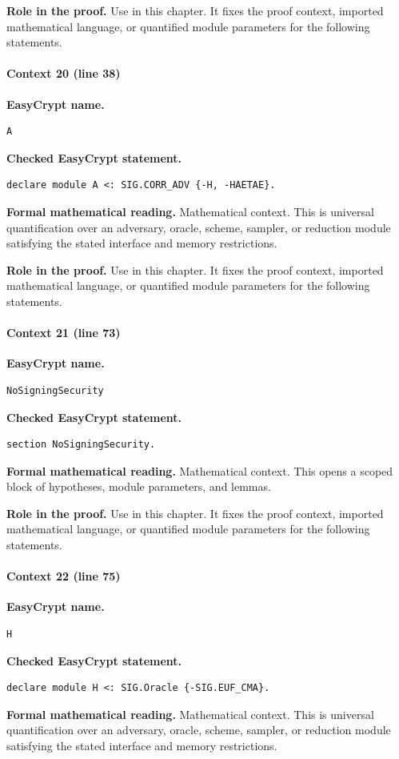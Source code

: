 \noindent\textbf{Role in the proof.}
Use in this chapter. It fixes the proof context, imported mathematical language, or quantified module parameters for the following statements.

\paragraph{Context 20 (line 38)}
\noindent\textbf{EasyCrypt name.}
\begin{lstlisting}[language=EasyCrypt,basicstyle=\ttfamily\scriptsize]
A
\end{lstlisting}
\noindent\textbf{Checked EasyCrypt statement.}
\begin{lstlisting}[language=EasyCrypt,basicstyle=\ttfamily\scriptsize]
declare module A <: SIG.CORR_ADV {-H, -HAETAE}.
\end{lstlisting}
\noindent\textbf{Formal mathematical reading.}
Mathematical context. This is universal quantification over an adversary, oracle, scheme, sampler, or reduction module satisfying the stated interface and memory restrictions.

\noindent\textbf{Role in the proof.}
Use in this chapter. It fixes the proof context, imported mathematical language, or quantified module parameters for the following statements.

\paragraph{Context 21 (line 73)}
\noindent\textbf{EasyCrypt name.}
\begin{lstlisting}[language=EasyCrypt,basicstyle=\ttfamily\scriptsize]
NoSigningSecurity
\end{lstlisting}
\noindent\textbf{Checked EasyCrypt statement.}
\begin{lstlisting}[language=EasyCrypt,basicstyle=\ttfamily\scriptsize]
section NoSigningSecurity.
\end{lstlisting}
\noindent\textbf{Formal mathematical reading.}
Mathematical context. This opens a scoped block of hypotheses, module parameters, and lemmas.

\noindent\textbf{Role in the proof.}
Use in this chapter. It fixes the proof context, imported mathematical language, or quantified module parameters for the following statements.

\paragraph{Context 22 (line 75)}
\noindent\textbf{EasyCrypt name.}
\begin{lstlisting}[language=EasyCrypt,basicstyle=\ttfamily\scriptsize]
H
\end{lstlisting}
\noindent\textbf{Checked EasyCrypt statement.}
\begin{lstlisting}[language=EasyCrypt,basicstyle=\ttfamily\scriptsize]
declare module H <: SIG.Oracle {-SIG.EUF_CMA}.
\end{lstlisting}
\noindent\textbf{Formal mathematical reading.}
Mathematical context. This is universal quantification over an adversary, oracle, scheme, sampler, or reduction module satisfying the stated interface and memory restrictions.

